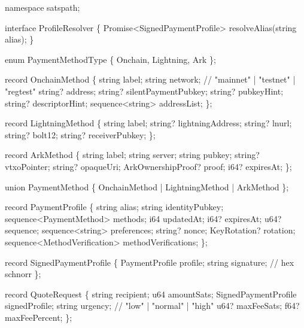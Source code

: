 \documentclass[
]{article}
\newenvironment{Shaded}{}{}
\newcommand{\NormalTok}[1]{#1}
\begin{document}
\begin{Shaded}
\begin{Highlighting}[]
\NormalTok{namespace satspath;}

\NormalTok{interface ProfileResolver \{}
\NormalTok{    Promise\textless{}SignedPaymentProfile\textgreater{} resolveAlias(string alias);}
\NormalTok{\}}

\NormalTok{enum PaymentMethodType \{ Onchain, Lightning, Ark \};}

\NormalTok{record OnchainMethod \{}
\NormalTok{    string label;}
\NormalTok{    string network;  // "mainnet" | "testnet" | "regtest"}
\NormalTok{    string? address;}
\NormalTok{    string? silentPaymentPubkey;}
\NormalTok{    string? pubkeyHint;}
\NormalTok{    string? descriptorHint;}
\NormalTok{    sequence\textless{}string\textgreater{} addressList;}
\NormalTok{\};}

\NormalTok{record LightningMethod \{}
\NormalTok{    string label;}
\NormalTok{    string? lightningAddress;}
\NormalTok{    string? lnurl;}
\NormalTok{    string? bolt12;}
\NormalTok{    string? receiverPubkey;}
\NormalTok{\};}

\NormalTok{record ArkMethod \{}
\NormalTok{    string label;}
\NormalTok{    string server;}
\NormalTok{    string pubkey;}
\NormalTok{    string? vtxoPointer;}
\NormalTok{    string? opaqueUri;}
\NormalTok{    ArkOwnershipProof? proof;}
\NormalTok{    i64? expiresAt;}
\NormalTok{\};}

\NormalTok{union PaymentMethod \{ OnchainMethod | LightningMethod | ArkMethod \};}

\NormalTok{record PaymentProfile \{}
\NormalTok{    string alias;}
\NormalTok{    string identityPubkey;}
\NormalTok{    sequence\textless{}PaymentMethod\textgreater{} methods;}
\NormalTok{    i64 updatedAt;}
\NormalTok{    i64? expiresAt;}
\NormalTok{    u64? sequence;}
\NormalTok{    sequence\textless{}string\textgreater{} preferences;}
\NormalTok{    string? nonce;}
\NormalTok{    KeyRotation? rotation;}
\NormalTok{    sequence\textless{}MethodVerification\textgreater{} methodVerifications;}
\NormalTok{\};}

\NormalTok{record SignedPaymentProfile \{}
\NormalTok{    PaymentProfile profile;}
\NormalTok{    string signature;  // hex schnorr}
\NormalTok{\};}

\NormalTok{record QuoteRequest \{}
\NormalTok{    string recipient;}
\NormalTok{    u64 amountSats;}
\NormalTok{    SignedPaymentProfile signedProfile;}
\NormalTok{    string urgency;  // "low" | "normal" | "high"}
\NormalTok{    u64? maxFeeSats;}
\NormalTok{    f64? maxFeePercent;}
\NormalTok{\};}


\end{Highlighting}
\end{Shaded}
\end{document}
